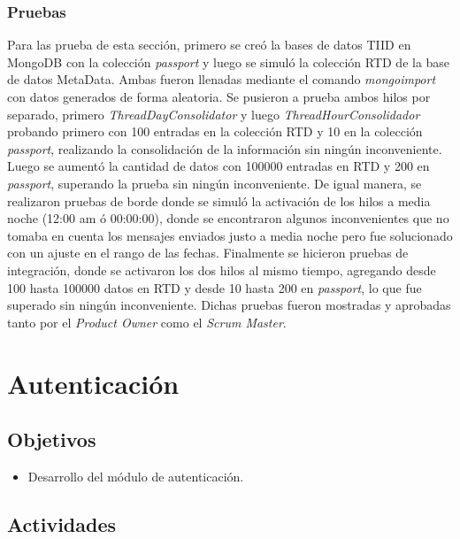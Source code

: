 \subsubsection{Pruebas}
\indent Para las prueba de esta sección, primero se creó la bases de datos TIID en MongoDB con la colección \textit{passport} y luego se simuló la colección RTD de la base de datos MetaData. Ambas fueron llenadas mediante el comando \textit{mongoimport} \cite{mimport} con datos generados de forma aleatoria. Se pusieron a prueba ambos hilos por separado, primero \textit{ThreadDayConsolidator} y luego \textit{ThreadHourConsolidador} probando primero con 100 entradas en la colección RTD y 10 en la colección \textit{passport}, realizando la consolidación de la información sin ningún inconveniente. Luego se aumentó la cantidad de datos con 100000 entradas en RTD y 200 en \textit{passport}, superando la prueba sin ningún inconveniente.
\newline
\newline
\indent De igual manera, se realizaron pruebas de borde donde se simuló la activación de los hilos a media noche (12:00 am ó 00:00:00), donde se encontraron algunos inconvenientes que no tomaba en cuenta los mensajes enviados justo a media noche pero fue solucionado con un ajuste en el rango de las fechas.
\newline
\newline
\indent Finalmente se hicieron pruebas de integración, donde se activaron los dos hilos al mismo tiempo, agregando desde 100 hasta 100000 datos en RTD y desde 10 hasta 200 en \textit{passport}, lo que fue superado sin ningún inconveniente. Dichas pruebas fueron mostradas y aprobadas tanto por el \textit{Product Owner} como el \textit{Scrum Master}.

\section{Autenticación} \label{sect:Autenticacion}

\subsection{Objetivos}
\begin{itemize}[noitemsep,nolistsep]
\item Desarrollo del módulo de autenticación. 
\end{itemize}

\subsection{Actividades}

